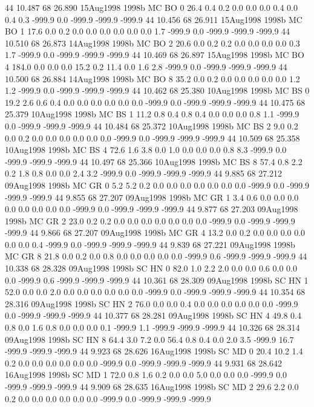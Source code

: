 44 10.487	68 26.890	15Aug1998	1998b	MC	BO	0	26.4	0.4	0.2	0.0	0.0	0.0	0.4	0.0	0.4	0.3	-999.9	0.0	-999.9	-999.9	-999.9
44 10.456	68 26.911	15Aug1998	1998b	MC	BO	1	17.6	0.0	0.2	0.0	0.0	0.0	0.0	0.0	0.0	1.7	-999.9	0.0	-999.9	-999.9	-999.9
44 10.510	68 26.873	14Aug1998	1998b	MC	BO	2	20.6	0.0	0.2	0.2	0.0	0.0	0.0	0.0	0.3	1.7	-999.9	0.0	-999.9	-999.9	-999.9
44 10.469	68 26.897	15Aug1998	1998b	MC	BO	4	184.0	0.0	0.0	0.0	15.2	0.2	11.4	0.0	1.6	2.8	-999.9	0.0	-999.9	-999.9	-999.9
44 10.500	68 26.884	14Aug1998	1998b	MC	BO	8	35.2	0.0	0.2	0.0	0.0	0.0	0.0	0.0	1.2	1.2	-999.9	0.0	-999.9	-999.9	-999.9
44 10.462	68 25.380	10Aug1998	1998b	MC	BS	0	19.2	2.6	0.6	0.4	0.0	0.0	0.0	0.0	0.0	0.0	-999.9	0.0	-999.9	-999.9	-999.9
44 10.475	68 25.379	10Aug1998	1998b	MC	BS	1	11.2	0.8	0.4	0.8	0.4	0.0	0.0	0.0	0.8	1.1	-999.9	0.0	-999.9	-999.9	-999.9
44 10.484	68 25.372	10Aug1998	1998b	MC	BS	2	9.0	0.2	0.0	0.2	0.0	0.0	0.0	0.0	0.0	0.0	-999.9	0.0	-999.9	-999.9	-999.9
44 10.509	68 25.358	10Aug1998	1998b	MC	BS	4	72.6	1.6	3.8	0.0	1.0	0.0	0.0	0.0	0.8	8.3	-999.9	0.0	-999.9	-999.9	-999.9
44 10.497	68 25.366	10Aug1998	1998b	MC	BS	8	57.4	0.8	2.2	0.2	1.8	0.8	0.0	0.0	2.4	3.2	-999.9	0.0	-999.9	-999.9	-999.9
44 9.885	68 27.212	09Aug1998	1998b	MC	GR	0	5.2	5.2	0.2	0.0	0.0	0.0	0.0	0.0	0.0	0.0	-999.9	0.0	-999.9	-999.9	-999.9
44 9.855	68 27.207	09Aug1998	1998b	MC	GR	1	3.4	0.6	0.0	0.0	0.0	0.0	0.0	0.0	0.0	0.0	-999.9	0.0	-999.9	-999.9	-999.9
44 9.877	68 27.203	09Aug1998	1998b	MC	GR	2	23.0	0.2	0.2	0.0	0.0	0.0	0.0	0.0	0.0	0.0	-999.9	0.0	-999.9	-999.9	-999.9
44 9.866	68 27.207	09Aug1998	1998b	MC	GR	4	13.2	0.0	0.2	0.0	0.0	0.0	0.0	0.0	0.0	0.4	-999.9	0.0	-999.9	-999.9	-999.9
44 9.839	68 27.221	09Aug1998	1998b	MC	GR	8	21.8	0.0	0.2	0.0	0.8	0.0	0.0	0.0	0.0	0.0	-999.9	0.6	-999.9	-999.9	-999.9
44 10.338	68 28.328	09Aug1998	1998b	SC	HN	0	82.0	1.0	2.2	2.0	0.0	0.0	0.6	0.0	0.0	0.0	-999.9	0.6	-999.9	-999.9	-999.9
44 10.361	68 28.309	09Aug1998	1998b	SC	HN	1	52.0	0.0	0.0	2.0	0.0	0.0	0.0	0.0	0.0	0.0	-999.9	0.0	-999.9	-999.9	-999.9
44 10.354	68 28.316	09Aug1998	1998b	SC	HN	2	76.0	0.0	0.0	0.4	0.0	0.0	0.0	0.0	0.0	0.0	-999.9	0.0	-999.9	-999.9	-999.9
44 10.377	68 28.281	09Aug1998	1998b	SC	HN	4	49.8	0.4	0.8	0.0	1.6	0.8	0.0	0.0	0.0	0.1	-999.9	1.1	-999.9	-999.9	-999.9
44 10.326	68 28.314	09Aug1998	1998b	SC	HN	8	64.4	3.0	7.2	0.0	56.4	0.8	0.4	0.0	2.0	3.5	-999.9	16.7	-999.9	-999.9	-999.9
44 9.923	68 28.626	16Aug1998	1998b	SC	MD	0	20.4	10.2	1.4	0.2	0.0	0.0	0.0	0.0	0.0	0.0	-999.9	0.0	-999.9	-999.9	-999.9
44 9.931	68 28.642	16Aug1998	1998b	SC	MD	1	72.0	0.8	1.6	0.2	0.0	0.0	5.0	0.0	0.0	0.0	-999.9	0.0	-999.9	-999.9	-999.9
44 9.909	68 28.635	16Aug1998	1998b	SC	MD	2	29.6	2.2	0.0	0.2	0.0	0.0	0.0	0.0	0.0	0.0	-999.9	0.0	-999.9	-999.9	-999.9
